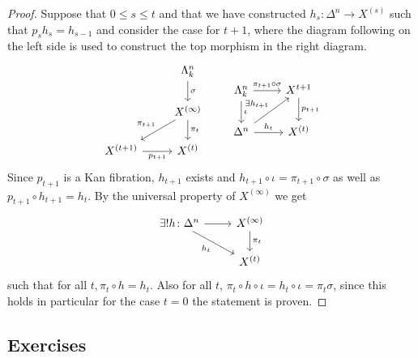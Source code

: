 \begin{proof}
    Suppose that $ 0 \leq s \leq t $ and that we have constructed $ h_s \colon \Delta^n \to X^{ ( s ) } $ such that $ p_s h_s = h_{s-1} $ and consider the case for $t+1$, where the diagram following on the left side is used to construct the top morphism in the right diagram.
    \[
    \begin{tikzcd}
        &
        \Lambda_k^n
        \ar[d, " \sigma "]
        \\
        &
        X^{(\infty)}
        \ar[d, " \pi_t "]
        \ar[dl, " \pi_{t+1} "']
        \\
        X^{(t+1)}
        \ar[r, " p_{t+1} "']
        &
        X^{(t)}
    \end{tikzcd}
    \qquad
    \begin{tikzcd}
        \Lambda_k^n
        \ar[d, " \iota "]
        \ar[r, " \pi_{t+1} \circ \sigma "]
        &
        X^{t+1}
        \ar[d, " p_{t+1}"]
        \\
        \Delta^n 
        \ar[ru, " \exists h_{t+1}"]
        \ar[r, "h_t"]
        &
        X^{(t)}
    \end{tikzcd}
    \]
    Since $ p_{t+1}$ is a Kan fibration, $ h_{t+1} $ exists and $h_{t+1} \circ \iota = \pi_{ t+1 } \circ \sigma $ as well as $ p_{ t + 1 } \circ h_{ t + 1 } = h_t $.
    By the universal property of $ X^{ ( \infty ) }$ we get 
    \[
    \begin{tikzcd}
        \exists! h \colon \Delta^n 
        \ar[r]
        \ar[rd, "h_t"']
        &
        X^{(\infty)}
        \ar[d, "\pi_t"]
        \\
        &
        X^{(t)}
    \end{tikzcd}
    \]
    such that for all $t, \pi_t \circ h = h_t $.
    Also for all $ t $,
    $ \pi_t \circ  h \circ \iota  = h_t \circ \iota = \pi_t \sigma $, since this holds in particular for the case $ t = 0 $ the statement is proven.
\end{proof}


\subsection{Exercises}

